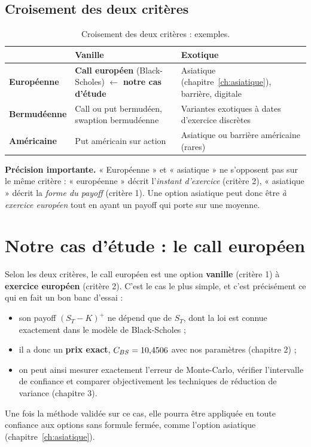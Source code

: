 \subsection{Croisement des deux critères}

\begin{table}[H]
\centering\small
\begin{tabularx}{\textwidth}{>{\bfseries}p{2.6cm}LL}
\toprule
 & Vanille & Exotique \\
\midrule
Européenne & \textbf{Call européen} (Black-Scholes) $\leftarrow$ \textbf{notre cas d'étude} & Asiatique (chapitre~\ref{ch:asiatique}), barrière, digitale \\
Bermudéenne & Call ou put bermudéen, swaption bermudéenne & Variantes exotiques à dates d'exercice discrètes \\
Américaine & Put américain sur action & Asiatique ou barrière américaine (rares) \\
\bottomrule
\end{tabularx}
\caption{Croisement des deux critères : exemples.}
\end{table}

\textbf{Précision importante.} « Européenne » et « asiatique » ne s'opposent pas sur le même critère : « européenne » décrit l'\emph{instant d'exercice} (critère 2), « asiatique » décrit la \emph{forme du payoff} (critère 1). Une option asiatique peut donc être \emph{à exercice européen} tout en ayant un payoff qui porte sur une moyenne.

\section{Notre cas d'étude : le call européen}

Selon les deux critères, le call européen est une option \textbf{vanille} (critère 1) à \textbf{exercice européen} (critère 2). C'est le cas le plus simple, et c'est précisément ce qui en fait un bon banc d'essai :
\begin{itemize}[nosep]
\item son payoff $(S_T-K)^+$ ne dépend que de $S_T$, dont la loi est connue exactement dans le modèle de Black-Scholes ;
\item il a donc un \textbf{prix exact}, $C_{BS} = 10{,}4506$ avec nos paramètres (chapitre 2) ;
\item on peut ainsi mesurer exactement l'erreur de Monte-Carlo, vérifier l'intervalle de confiance et comparer objectivement les techniques de réduction de variance (chapitre 3).
\end{itemize}
Une fois la méthode validée sur ce cas, elle pourra être appliquée en toute confiance aux options sans formule fermée, comme l'option asiatique (chapitre~\ref{ch:asiatique}).

